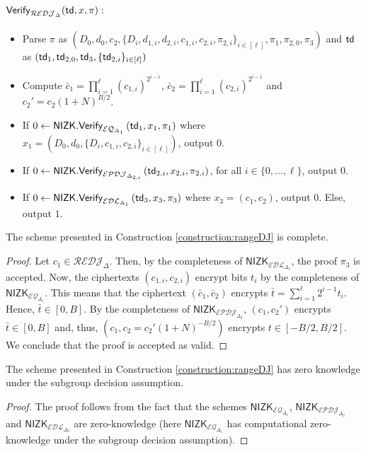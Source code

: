 \begin{construction}
 \paragraph{$\mathsf{Verify}_{\mathcal{REDJ}_{\Delta}}(\mathsf{td},x,\pi):$}
  \begin{itemize}
  \item Parse $\pi$ as $(D_0,d_0,c_2,\{D_i,d_{1,i},d_{2,i},c_{1,i},c_{2,i},\pi_{2,i}\}_{i\in [\ell]},\pi_1,\pi_{2,0},\pi_3)$ and $\mathsf{td}$ as $(\mathsf{td}_1,\mathsf{td}_{2,0},\mathsf{td}_3,\{\mathsf{td}_{2,i}\}_{i\in [\ell]})$
  \item Compute $\bar c_1=\prod_{i=1}^\ell (c_{1,i})^{2^{i-1}}$, $\bar c_2=\prod_{i=1}^\ell (c_{2,i})^{2^{i-1}}$ and $c_2'=c_2(1+N)^{B/2}$.
  \item If $0\leftarrow\mathsf{NIZK.Verify}_{\mathcal{EQ}_{\Delta_1}}\left(\mathsf{td}_1, x_1,\pi_1\right)$ where $ x_1=(D_0,d_0,\{D_i,c_{1,i},c_{2,i}\}_{i\in [\ell]})$, output $0$.
  \item If $0\leftarrow\mathsf{NIZK.Verify}_{\mathcal{EPDJ}_{\Delta_{2,i}}}\left(\mathsf{td}_{2,i}, x_{2,i},\pi_{2,i}\right)$, for all $i\in \{0, \dots, \ell\}$, output $0$.
  \item If $0\leftarrow\mathsf{NIZK.Verify}_{\mathcal{EDL}_{\Delta_1}}\left(\mathsf{td}_3, x_3,\pi_3\right)$ where $x_3=(c_1,c_2)$, output $0$. Else, output $1$.
 \end{itemize}
\end{construction}

\begin{lemma}
\label{lemma:completerangeDJ}
The scheme presented in Construction \ref{construction:rangeDJ} is complete.
\end{lemma}
\begin{proof}
Let $c_1\in\mathcal{REDJ}_\Delta$. Then, by the completeness of $\mathsf{NIZK}_{\mathcal{EDL}_{\Delta_3}}$, the proof $\pi_3$ is accepted. Now, the ciphertexts $(c_{1,i},c_{2,i})$ encrypt bits $t_i$ by the completeness of $\mathsf{NIZK}_{\mathcal{EQ}_{\Delta_1}}$. This means that the ciphertext $(\bar c_1,\bar c_2)$ encrypts $\bar t=\sum_{i=1}^\ell 2^{i-1}t_i$. Hence, $\bar t\in [0,B]$. By the completeness of $\mathsf{NIZK}_{\mathcal{EPDJ}_{\Delta_2}}$, $(c_1,c_2')$ encrypts $\bar t \in [0,B]$ and, thus, $(c_1,c_2=c_2'(1+N)^{-B/2})$ encrypts $t\in [-B/2,B/2]$. We conclude that the proof is accepted as valid. 

\end{proof}

\begin{lemma}
\label{lemma:zkrangeDJ}
The scheme presented in Construction \ref{construction:rangeDJ} has zero knowledge under the subgroup decision assumption.
\end{lemma}
\begin{proof}
The proof follows from the fact that the schemes $\mathsf{NIZK}_{\mathcal{EQ}_{\Delta_1}}$, $\mathsf{NIZK}_{\mathcal{EPDJ}_{\Delta_2}}$ and $\mathsf{NIZK}_{\mathcal{EDL}_{\Delta_3}}$ are zero-knowledge (here $\mathsf{NIZK}_{\mathcal{EQ}_{\Delta_1}}$ has computational zero-knowledge under the subgroup decision assumption).

\end{proof}


